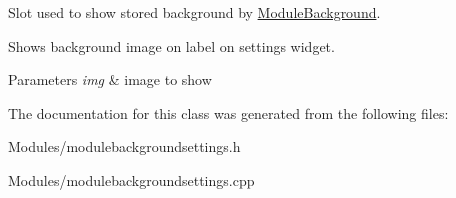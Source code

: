 Slot used to show stored background by \hyperlink{class_module_background}{ModuleBackground}. 

Shows background image on label on settings widget. 
\begin{DoxyParams}{Parameters}
{\em img} & image to show \\
\hline
\end{DoxyParams}


The documentation for this class was generated from the following files:\begin{DoxyCompactItemize}
\item 
Modules/modulebackgroundsettings.h\item 
Modules/modulebackgroundsettings.cpp\end{DoxyCompactItemize}
